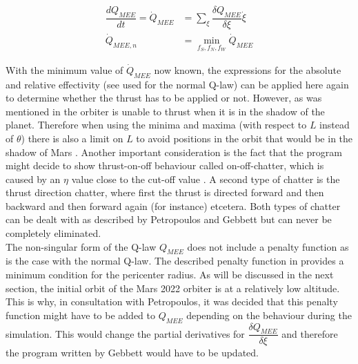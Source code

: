 \begin{equation} \label{eq:qdot_mee}
\begin{split}
\dfrac{dQ_{MEE}}{dt}=\dot{Q}_{MEE}&=\displaystyle\sum_{\xi}\dfrac{\delta Q_{MEE}}{\delta \xi}\dot{\xi}\\
\dot{Q}_{MEE,n} &= \displaystyle\min_{f_{S},f_{N},f_{W}}\dot{Q}_{MEE}
\end{split}
\end{equation}

With the minimum value of $\dot{Q}_{MEE}$ now known, the expressions for the absolute and relative effectivity (see  used for the normal Q-law) can be applied here again to determine whether the thrust has to be applied or not. However, as was mentioned in  the orbiter is unable to thrust when it is in the shadow of the planet. Therefore when using the minima and maxima (with respect to $L$ instead of $\theta$) there is also a limit on $L$ to avoid positions in the orbit that would be in the shadow of Mars \cite{gebbett2014multi}. Another important consideration is the fact that the program might decide to show thrust-on-off behaviour called on-off-chatter, which is caused by an $\eta$ value close to the cut-off value \cite{petropoulos2005refinements}. A second type of chatter is the thrust direction chatter, where first the thrust is directed forward and then backward and then forward again (for instance) etcetera. Both types of chatter can be dealt with as described by Petropoulos \cite{petropoulos2005refinements} and Gebbett \cite{gebbett2014multi} but can never be completely eliminated. \\
The non-singular form of the Q-law $Q_{MEE}$ does not include a penalty function as is the case with the normal Q-law. The described penalty function in  provides a minimum condition for the pericenter radius. As will be discussed in the next section, the initial orbit of the Mars 2022 orbiter is at a relatively low altitude. This is why, in consultation with Petropoulos, it was decided that this penalty function might have to be added to $Q_{MEE}$ depending on the behaviour during the simulation. This would change the partial derivatives for $\dfrac{\delta Q_{MEE}}{\delta \xi}$ and therefore the program written by Gebbett \cite{gebbett2014multi} would have to be updated.


